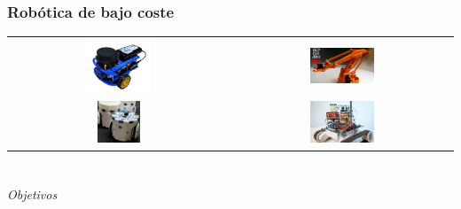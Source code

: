 \documentclass{beamer}
\begin{document}
\begin{frame}
\frametitle{Robótica de bajo coste}
\begin{table}[htbp]
  \centering
  \begin{tabular}{cc}
      \includegraphics[width=0.3\textwidth, valign=m]{figs/andino.png} & \includegraphics[width=0.3\textwidth, valign=m]{figs/eezy.jpg} \\
      \includegraphics[width=0.2\textwidth, valign=m]{figs/hero.png} & \includegraphics[width=0.3\textwidth, valign=m]{figs/r5robot.png} 
  \end{tabular}
\end{table}
\end{frame}

\section*{}
\begin{frame}{}
  \centering \Huge
  \emph{Objetivos}
\end{frame}
\end{document}
